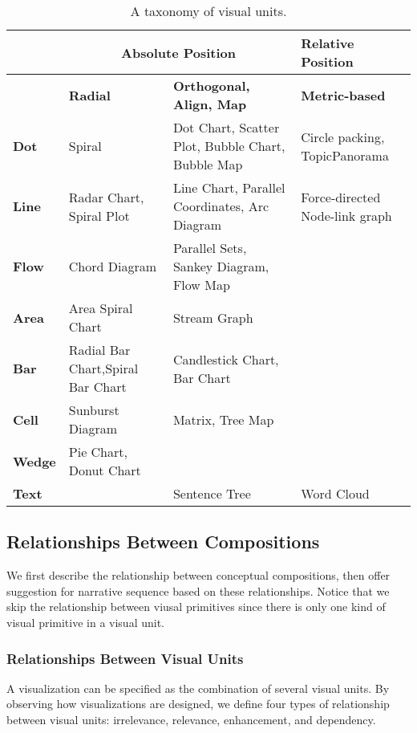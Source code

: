 \begin{table}[tb]
  \caption{A taxonomy of visual units.}
  \label{tab:unit}
  \small
  \centering
  \begin{tabular}{p{1.2cm}|p{1.6cm}|p{1.6cm}|p{1.6cm}}
  \toprule
  \textbf{} &\multicolumn{2}{|c|}{\textbf{Absolute Position}} &\textbf{Relative Position}   \\ 
  \midrule
 \textbf{} &\textbf{Radial} &\textbf{Orthogonal, Align, Map} &\textbf{Metric-based}   \\ 
  \midrule
  \textbf{Dot} &Spiral&Dot Chart, Scatter Plot, Bubble Chart, Bubble Map &Circle packing, TopicPanorama\cite{7042494}\\
  \midrule
  \textbf{Line}&  Radar Chart, Spiral Plot    &Line Chart, Parallel Coordinates, Arc Diagram &  Force-directed Node-link graph   \\ 
  \midrule
   \textbf{Flow}&  Chord Diagram   &Parallel Sets, Sankey Diagram, 
   Flow Map  & \\
  \midrule
  \textbf{Area}&  Area Spiral Chart &Stream Graph &  \\ 
  \midrule
  \textbf{Bar}&      Radial Bar Chart,Spiral Bar Chart  & Candlestick Chart, Bar Chart  &   \\
  \midrule
  \textbf{Cell}& Sunburst Diagram  &Matrix, Tree Map &  \\
  \midrule
  \textbf{Wedge}& Pie Chart, Donut Chart &  &  \\
  \midrule
  \textbf{Text}&    &  Sentence Tree  & Word Cloud \\
  \bottomrule
  
  \end{tabular}
  \vspace{1mm}
\end{table}

\subsection{Relationships Between Compositions}\label{relationship}
We first describe the relationship between conceptual compositions, then offer suggestion for narrative sequence based on these relationships. Notice that we skip the relationship between viusal primitives since there is only one kind of visual primitive in a visual unit. 
\subsubsection{Relationships Between Visual Units}
A visualization can be specified as the combination of several visual units. 
By observing how visualizations are designed,
we define four types of relationship between visual units: irrelevance, relevance, enhancement, and dependency. 

